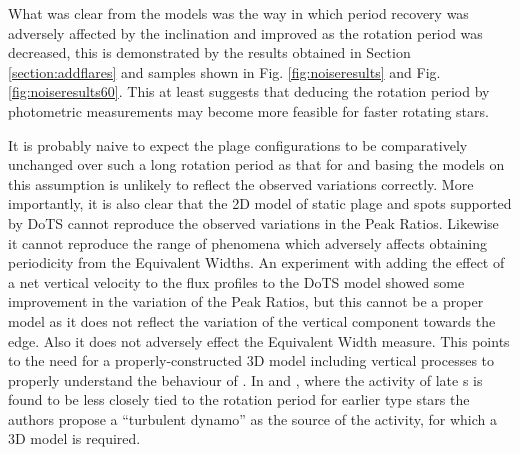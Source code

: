 What was clear from the models was the way in which period recovery was adversely affected by the inclination and
improved as the rotation period was decreased, this is demonstrated by the results obtained in Section
\ref{section:addflares} and samples shown in Fig. \ref{fig:noiseresults} and Fig. \ref{fig:noiseresults60}. This
at least suggests that deducing the rotation period by photometric measurements may become more feasible for faster
rotating stars.

It is probably naive to expect the plage configurations to be comparatively unchanged over such a long rotation period
as that for {\prox} and basing the models on this assumption is unlikely to reflect the observed variations
correctly. More importantly, it is also clear that the 2D model of static plage and spots supported by DoTS cannot
reproduce the observed variations in the Peak Ratios. Likewise it cannot reproduce the range of phenomena which
adversely affects obtaining periodicity from the Equivalent Widths. An experiment with adding the effect of a net
vertical velocity to the flux profiles to the DoTS model showed some improvement in the variation of the Peak Ratios,
but this cannot be a proper model as it does not reflect the variation of the vertical component towards the edge. Also
it does not adversely effect the Equivalent Width measure. This points to the need for a properly-constructed 3D model
including vertical processes to properly understand the behaviour of \prox. In \citet{mohanty02} and \citet{mohanty03},
where the activity of late \rdwarf s is found to be less closely tied to the rotation period for earlier type stars the
authors propose a ``turbulent dynamo'' as the source of the activity, for which a 3D model is required.


